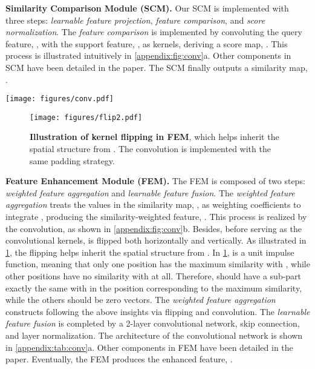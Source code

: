 \documentclass[10pt,twocolumn,letterpaper]{article}
\begin{document}
\vspace{2pt}\noindent\textbf{Similarity Comparison Module (SCM).}
Our SCM is implemented with three steps: \textit{learnable feature projection}, \textit{feature comparison}, and \textit{score normalization}. 
The \textit{feature comparison} is implemented by convoluting the query feature, , with the support feature, , as kernels, deriving a score map, . This process is illustrated intuitively in \cref{appendix:fig:conv}a. 
Other components in SCM have been detailed in the paper. 
The SCM finally outputs a similarity map, . 


\begin{figure*}[tb]
  \centering
  \texttt{[image: figures/conv.pdf]}
  \caption{\textbf{(a) Illustration of the \textit{feature comparison}} in SCM under the 1-shot case, where the feature projection is omitted. \textbf{(b) Illustration of the \textit{weighted feature aggregation}} in FEM under the 1-shot case.}
  \label{appendix:fig:conv}
\end{figure*}


\begin{figure}[tb]
\centering
\texttt{[image: figures/flip2.pdf]}
\caption{
    \textbf{Illustration of kernel flipping in FEM}, which helps  inherit the spatial structure from . The convolution is implemented with the same padding strategy. 
}
\label{appendix:fig:flip}
\end{figure}


\vspace{2pt}\noindent\textbf{Feature Enhancement Module (FEM).} 
The FEM is composed of two steps: \textit{weighted feature aggregation} and \textit{learnable feature fusion}. 
The \textit{weighted feature aggregation} treats the values in the similarity map, , as weighting coefficients to integrate , producing the similarity-weighted feature, . 
This process is realized by the convolution, as shown in \cref{appendix:fig:conv}b. 
Besides, before serving as the convolutional kernels,  is flipped both horizontally and vertically. 
As illustrated in \cref{appendix:fig:flip}, the flipping helps  inherit the spatial structure from . 
In \cref{appendix:fig:flip},  is a unit impulse function, meaning that only one position has the maximum similarity with , while other positions have no similarity with  at all. 
Therefore,  should have a sub-part exactly the same with  in the position corresponding to the maximum similarity, while the others should be zero vectors. 
The \textit{weighted feature aggregation} constructs  following the above insights via flipping and convolution. 
The \textit{learnable feature fusion} is completed by a 2-layer convolutional network, skip connection, and layer normalization. 
The architecture of the convolutional network is shown in \cref{appendix:tab:conv}a. 
Other components in FEM have been detailed in the paper. 
Eventually, the FEM produces the enhanced feature, . 
\end{document}
